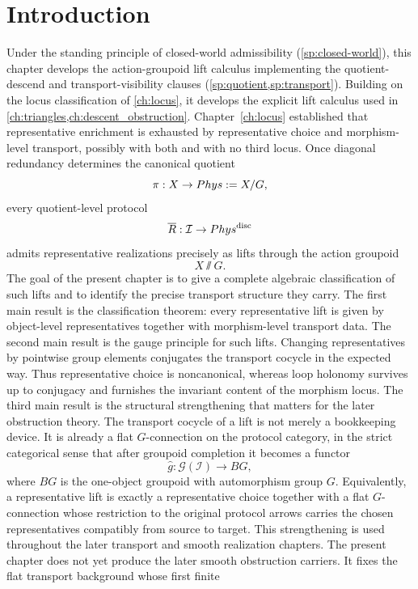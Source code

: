 \section{Introduction}
Under the standing principle of closed-world admissibility
(\cref{sp:closed-world}), this chapter develops the action-groupoid lift
calculus implementing the quotient-descend and transport-visibility
clauses (\cref{sp:quotient,sp:transport}).
Building on the locus classification of \cref{ch:locus}, it develops the
explicit lift calculus used in \cref{ch:triangles,ch:descent_obstruction}.
Chapter~\ref{ch:locus} established that representative enrichment is
exhausted by representative choice and morphism-level transport,
possibly with both and with no third locus.
Once diagonal redundancy determines the canonical quotient
\[
	\pi:X\to Phys:=X/G,
\]
every quotient-level protocol
\[
	\overline R:\mathcal I\to Phys^{\mathrm{disc}}
\]
admits representative realizations precisely as lifts through the
action groupoid
\[
	X\sslash G.
\]
The goal of the present chapter is to give a complete algebraic
classification of such lifts and to identify the precise transport
structure they carry.
\medskip
The first main result is the classification theorem: every
representative lift is given by object-level representatives together
with morphism-level transport data.
\medskip
The second main result is the gauge principle for such lifts.
Changing representatives by pointwise group elements conjugates the
transport cocycle in the expected way.
Thus representative choice is noncanonical, whereas loop holonomy
survives up to conjugacy and furnishes the invariant content of the
morphism locus.
\medskip
The third main result is the structural strengthening that matters for
the later obstruction theory.
The transport cocycle of a lift is not merely a bookkeeping device.
It is already a flat \(G\)-connection on the protocol category, in the
strict categorical sense that after groupoid completion it becomes a
functor
\[
	\widehat g:\mathcal G(\mathcal I)\to BG,
\]
where \(BG\) is the one-object groupoid with automorphism group \(G\).
Equivalently, a representative lift is exactly a representative choice
together with a flat \(G\)-connection whose restriction to the
original protocol arrows carries the chosen representatives
compatibly from source to target.
This strengthening is used throughout the later transport and smooth
realization chapters.
The present chapter does not yet produce the later smooth obstruction
carriers. It fixes the flat transport background whose first finite
